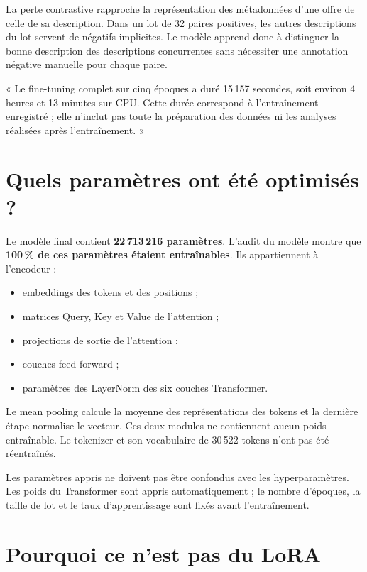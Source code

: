 \documentclass[12pt,a4paper]{article}
\begin{document}
La perte contrastive rapproche la représentation des métadonnées d'une offre de celle de sa
description. Dans un lot de 32 paires positives, les autres descriptions du lot servent de
négatifs implicites. Le modèle apprend donc à distinguer la bonne description des descriptions
concurrentes sans nécessiter une annotation négative manuelle pour chaque paire.

\begin{oralbox}
« Le fine-tuning complet sur cinq époques a duré 15\,157 secondes, soit environ 4 heures et
13 minutes sur CPU. Cette durée correspond à l'entraînement enregistré ; elle n'inclut pas toute
la préparation des données ni les analyses réalisées après l'entraînement. »
\end{oralbox}

\section{Quels paramètres ont été optimisés ?}

Le modèle final contient \textbf{22\,713\,216 paramètres}. L'audit du modèle montre que
\textbf{100\,\% de ces paramètres étaient entraînables}. Ils appartiennent à l'encodeur :

\begin{itemize}
  \item embeddings des tokens et des positions ;
  \item matrices Query, Key et Value de l'attention ;
  \item projections de sortie de l'attention ;
  \item couches feed-forward ;
  \item paramètres des LayerNorm des six couches Transformer.
\end{itemize}

Le mean pooling calcule la moyenne des représentations des tokens et la dernière étape normalise
le vecteur. Ces deux modules ne contiennent aucun poids entraînable. Le tokenizer et son
vocabulaire de 30\,522 tokens n'ont pas été réentraînés.

\begin{alertbox}
Les paramètres appris ne doivent pas être confondus avec les hyperparamètres. Les poids du
Transformer sont appris automatiquement ; le nombre d'époques, la taille de lot et le taux
d'apprentissage sont fixés avant l'entraînement.
\end{alertbox}

\newpage
\section{Pourquoi ce n'est pas du LoRA}
\end{document}

